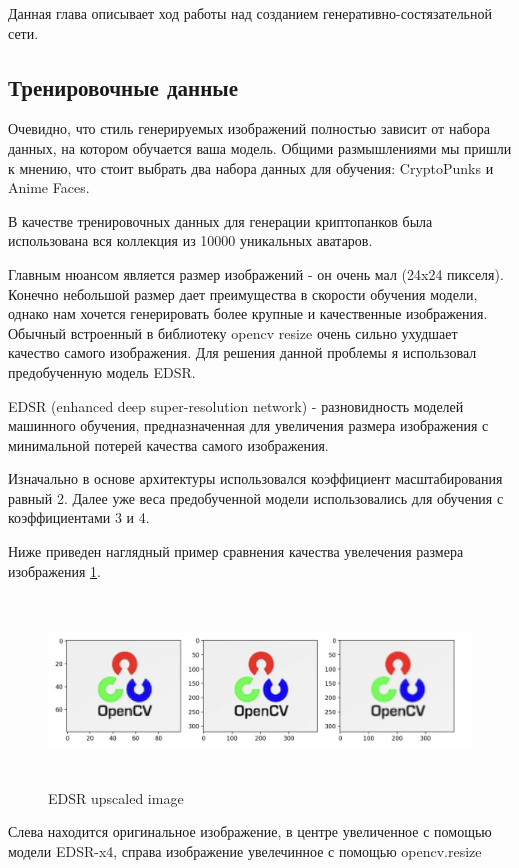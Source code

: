 Данная глава описывает ход работы над созданием генеративно-состязательной сети.

\subsection{Тренировочные данные}

Очевидно, что стиль генерируемых изображений полностью зависит от набора данных, на котором обучается ваша модель. Общими размышлениями мы пришли к мнению, что стоит выбрать два набора данных для обучения: CryptoPunks и Anime Faces.

В качестве тренировочных данных для генерации криптопанков была использована вся коллекция из 10000 уникальных аватаров\cite{cryptopunks_dataset}.


Главным нюансом является размер изображений - он очень мал (24x24 пикселя). Конечно небольшой размер дает преимущества в скорости обучения модели, однако нам хочется генерировать более крупные и качественные изображения.
Обычный встроенный в библиотеку opencv resize очень сильно ухудшает качество самого изображения. Для решения данной проблемы я использовал предобученную модель EDSR.\cite{EDSR}

\begin{definition}
    EDSR (enhanced deep super-resolution network) - разновидность моделей машинного обучения, предназначенная для увеличения размера изображения с минимальной потерей качества самого изображения.
\end{definition}

Изначально в основе архитектуры использовался коэффициент масштабирования равный 2. Далее уже веса предобученной модели использовались для обучения с коэффициентами 3 и 4.

Ниже приведен наглядный пример сравнения качества увелечения размера изображения {\color{blue} \ref{fig.EDSR_difference}}.
\begin{figure}
    \centering
    \includegraphics[height=50mm]{fig/EDSR_difference.png}
    \caption{EDSR upscaled image}
    \label{fig.EDSR_difference}
\end{figure}
Слева находится оригинальное изображение, в центре увеличенное с помощью модели EDSR-x4, справа изображение увелечинное с помощью opencv.resize

